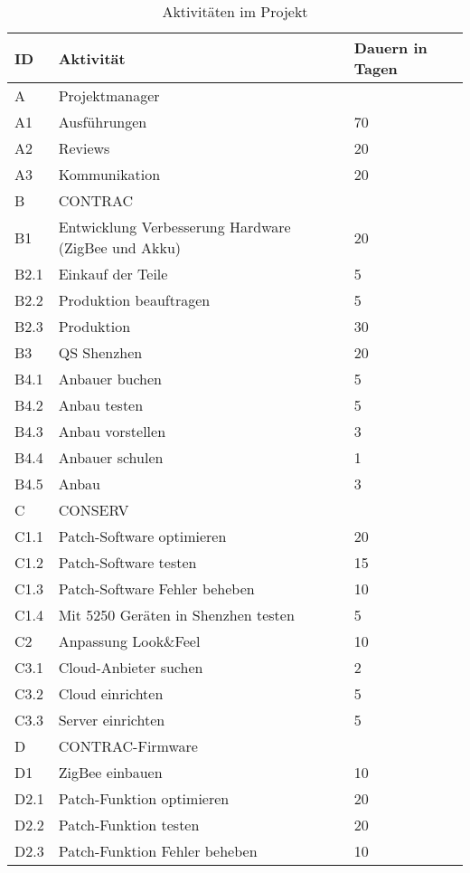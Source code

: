 \begin{table}[H]
	\renewcommand{\arraystretch}{1.05}
	\begin{center}
		\begin{tabular}{l|l|l}
			\hline
			\textbf{ID} & \textbf{Aktivität} & \textbf{Dauern in Tagen}\\\hline
			A    & Projektmanager &  \\ \hline
			A1   & Ausführungen & 70 \\  \hline
			A2   & Reviews & 20 \\ \hline
			A3 & Kommunikation & 20 \\\hline
			B    & CONTRAC & \\ \hline
			B1   & Entwicklung Verbesserung Hardware (ZigBee und Akku) & 20\\ \hline
			B2.1 & Einkauf der Teile & 5\\\hline
			B2.2 & Produktion beauftragen & 5\\ \hline
			B2.3 & Produktion & 30\\ \hline
			B3 & QS Shenzhen & 20\\ \hline
			B4.1 & Anbauer buchen & 5\\ \hline
			B4.2 & Anbau testen &5\\ \hline
			B4.3 & Anbau vorstellen &3\\ \hline
			B4.4 & Anbauer schulen &1\\ \hline
			B4.5 & Anbau &3\\ \hline
			C    & CONSERV &\\ \hline
			C1.1 & Patch-Software optimieren & 20\\ \hline
			C1.2 & Patch-Software testen  & 15 \\ \hline
			C1.3 & Patch-Software Fehler beheben  & 10\\ \hline
			C1.4  & Mit 5250 Geräten in Shenzhen testen  & 5\\ \hline
			C2 & Anpassung Look\&Feel  & 10\\\hline
			C3.1 & Cloud-Anbieter suchen  & 2\\ \hline
			C3.2 & Cloud einrichten       & 5\\ \hline
			C3.3 & Server einrichten      & 5\\ \hline
			D    & CONTRAC-Firmware      & \\ \hline
			D1   & ZigBee einbauen       & 10 \\ \hline
			D2.1 & Patch-Funktion optimieren & 20 \\ \hline
			D2.2 & Patch-Funktion testen & 20 \\ \hline
			D2.3 & Patch-Funktion Fehler beheben  & 10 \\
		\end{tabular}
		\caption{Aktivitäten im Projekt}
	\end{center}
\end{table}

